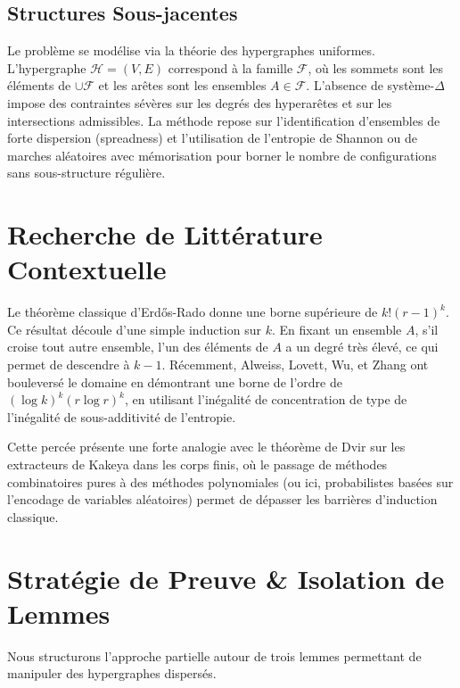 \documentclass[12pt,a4paper]{article}
\begin{document}
\subsection{Structures Sous-jacentes}

Le problème se modélise via la théorie des hypergraphes uniformes. L'hypergraphe $\mathcal{H} = (V, E)$ correspond à la famille $\mathcal{F}$, où les sommets sont les éléments de $\cup \mathcal{F}$ et les arêtes sont les ensembles $A \in \mathcal{F}$. L'absence de système-$\Delta$ impose des contraintes sévères sur les degrés des hyperarêtes et sur les intersections admissibles.
La méthode repose sur l'identification d'ensembles de forte dispersion (spreadness) et l'utilisation de l'entropie de Shannon ou de marches aléatoires avec mémorisation pour borner le nombre de configurations sans sous-structure régulière.

\section{Recherche de Littérature Contextuelle}

Le théorème classique d'Erdős-Rado donne une borne supérieure de $k!(r-1)^k$. Ce résultat découle d'une simple induction sur $k$. En fixant un ensemble $A$, s'il croise tout autre ensemble, l'un des éléments de $A$ a un degré très élevé, ce qui permet de descendre à $k-1$.
Récemment, Alweiss, Lovett, Wu, et Zhang ont bouleversé le domaine en démontrant une borne de l'ordre de $(\log k)^k (r \log r)^k$, en utilisant l'inégalité de concentration de type de l'inégalité de sous-additivité de l'entropie.

Cette percée présente une forte analogie avec le théorème de Dvir sur les extracteurs de Kakeya dans les corps finis, où le passage de méthodes combinatoires pures à des méthodes polynomiales (ou ici, probabilistes basées sur l'encodage de variables aléatoires) permet de dépasser les barrières d'induction classique.

\section{Stratégie de Preuve \& Isolation de Lemmes}

Nous structurons l'approche partielle autour de trois lemmes permettant de manipuler des hypergraphes dispersés.
\end{document}
